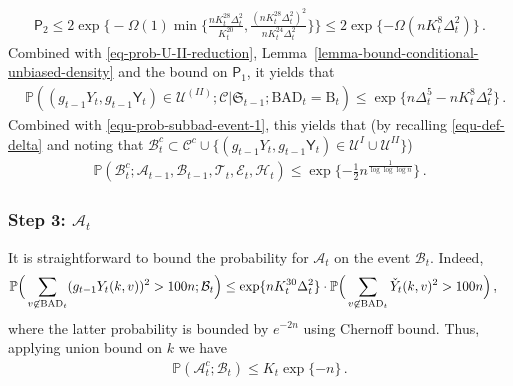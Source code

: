 \documentclass[11pt]{article}
\numberwithin{equation}{section}
\begin{document}
\begin{align*}
    \mathsf P_2 \leq 2 \exp \Big\{ - \Omega(1) \min \Big\{ \frac{ n K_{t}^{28} \Delta_{t}^2 }{ K_{t}^{20} }, \frac{ ( n K_{t}^{28} \Delta_{t}^2 )^2 }{n K_{t}^{24} \Delta_{t}^2}  \Big\}  \Big\} \leq 2 \exp \{ - \Omega( n K_t^{8} \Delta_{t}^2 ) \} \,.
\end{align*}
  Combined with \eqref{eq-prob-U-II-reduction}, Lemma~\ref{lemma-bound-conditional-unbiased-density} and the bound on $\mathsf P_1$, it yields that
\begin{align}
    & \mathbb{P} ( (g_{t-1} Y_t, g_{t-1} \mathsf{Y}_t) \in \mathcal{U}^{(II)}; \mathcal{C} | \mathfrak{S}_{t-1}; \mathrm{BAD}_t = \mathrm{B}_t ) \leq \exp \{ n \Delta_t^5 - n K_t^{8} \Delta_t^2  \} \,. \label{equ-prob-subbad-event-2}
\end{align}
Combined with \eqref{equ-prob-subbad-event-1}, this yields that (by recalling \eqref{equ-def-delta} and noting that $\mathcal{B}_t^{c} \subset \mathcal{C}^{c} \cup \{ (g_{t-1} Y_t, g_{t-1} \mathsf{Y}_t) \in \mathcal U^I \cup \mathcal U^{II} \}$)
\begin{align}
    \mathbb{P} (\mathcal{B}_{t}^{c}; \mathcal{A}_{t-1}, \mathcal{B}_{t-1}, \mathcal{T}_{t}, \mathcal{E}_{t}, \mathcal{H}_{t} ) \leq  \exp \{ - \frac{1}{2} n^{ \frac{1}{\log \log \log n}} \} \,.
    \label{equ-prob-B-happens}
\end{align}






















\subsubsection{Step 3: $\mathcal{A}_{t}$}
It is straightforward to bound the probability for $\mathcal{A}_t$ on the event $\mathcal{B}_t$. Indeed,
\begin{align*}
    & \mathbb{P} \Big(  \sum_{v \not \in \mathrm{BAD}_{t}} ( g_{t-1} Y_t(k,v) )^2 > 100 n ; \mathcal{B}_t \Big) \leq \exp \{ n K_{t}^{30} \Delta_t^2 \} \cdot \mathbb{P} \Big(  \sum_{v \not \in \mathrm{BAD}_{t}} \Check{Y}_t(k,v)^2 > 100n \Big)  \,,
\end{align*}
where the latter probability is bounded by $e^{- 2n}$ using Chernoff bound. Thus, applying union bound on $k$ we have 
\begin{align}
    \mathbb{P}( \mathcal{A}_{t}^{c} ; \mathcal{B}_t ) \leq K_t \exp \{ - n \} \,.
    \label{equ-prob-mathcal-A-t-happens}
\end{align}
\end{document}
